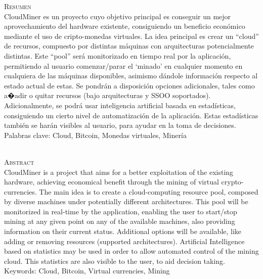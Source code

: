 \textsc {\Large Resumen }\\[1.0cm]
CloudMiner es un proyecto cuyo objetivo principal es conseguir un mejor
aprovechamiento del hardware existente, consiguiendo un beneficio econ\'omico
mediante el uso de cripto-monedas virtuales. La idea principal es crear un
``cloud'' de recursos, compuesto por distintas m\'aquinas con arquitecturas
potencialmente distintas. Este ``pool'' ser\'a monitorizado en tiempo real por
la aplicaci\'on, permitiendo al usuario comenzar/parar el `minado' en cualquier
momento en cualquiera de las m\'aquinas disponibles, asimismo d\'andole
informaci\'on respecto al estado actual de estas. Se pondr\'an a disposici\'on
opciones adicionales, tales como a�adir o quitar recursos (bajo arquitecturas y
SSOO soportados). Adicionalmente, se podr\'a usar inteligencia artificial basada
en estad\'isticas, consiguiendo un cierto nivel de automatizaci\'on de la
aplicaci\'on. Estas estad\'isticas tambi\'en se har\'an visibles al usuario,
para ayudar en la toma de decisiones.
~\\[0.3cm]
Palabras clave: Cloud, Bitcoin, Monedas virtuales, Miner\'ia
 
~\\[1.4cm]

\textsc {\Large Abstract }\\[1.0cm]

CloudMiner is a project that aims for a better exploitation of the existing
hardware, achieving economical benefit through the mining of virtual
crypto-currencies. The main idea is to create a cloud-computing resource pool,
composed by diverse machines under potentially different architectures. This
pool will be monitorized in real-time by the application, enabling the user to
start/stop mining at any given point on any of the available machines, also
providing information on their current status. Additional options will be
available, like adding or removing resources (supported architectures).
Artificial Intelligence based on statistics may be used in order to allow
automated control of the mining cloud. This statistics are also visible to the
user, to aid decision taking.
~\\[0.3cm]
Keywords: Cloud, Bitcoin, Virtual currencies, Mining
 

